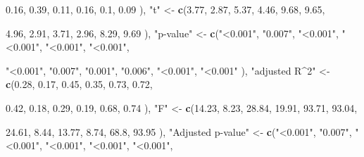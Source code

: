 \documentclass[
]{article}
\newenvironment{Shaded}{\begin{snugshade}}{\end{snugshade}}
\newcommand{\FloatTok}[1]{\textcolor[rgb]{0.00,0.00,0.81}{#1}}
\newcommand{\KeywordTok}[1]{\textcolor[rgb]{0.13,0.29,0.53}{\textbf{#1}}}
\newcommand{\NormalTok}[1]{#1}
\newcommand{\StringTok}[1]{\textcolor[rgb]{0.31,0.60,0.02}{#1}}
\begin{document}
\begin{Shaded}
\begin{Highlighting}[]
                                      \FloatTok{0.16}\NormalTok{, }\FloatTok{0.39}\NormalTok{, }\FloatTok{0.11}\NormalTok{, }\FloatTok{0.16}\NormalTok{, }\FloatTok{0.1}\NormalTok{, }\FloatTok{0.09}
\NormalTok{                                      ), }
                \StringTok{"t"}\NormalTok{ <-}\StringTok{ }\KeywordTok{c}\NormalTok{(}\FloatTok{3.77}\NormalTok{, }\FloatTok{2.87}\NormalTok{, }\FloatTok{5.37}\NormalTok{, }\FloatTok{4.46}\NormalTok{, }\FloatTok{9.68}\NormalTok{, }\FloatTok{9.65}\NormalTok{,}
                        
                          \FloatTok{4.96}\NormalTok{, }\FloatTok{2.91}\NormalTok{, }\FloatTok{3.71}\NormalTok{, }\FloatTok{2.96}\NormalTok{, }\FloatTok{8.29}\NormalTok{, }\FloatTok{9.69}
\NormalTok{                         ),}
                \StringTok{"p-value"}\NormalTok{ <-}\StringTok{ }\KeywordTok{c}\NormalTok{(}\StringTok{"<0.001"}\NormalTok{, }\StringTok{"0.007"}\NormalTok{, }\StringTok{"<0.001"}\NormalTok{, }\StringTok{"<0.001"}\NormalTok{, }\StringTok{"<0.001"}\NormalTok{, }\StringTok{"<0.001"}\NormalTok{,}
                               
                               \StringTok{"<0.001"}\NormalTok{, }\StringTok{"0.007"}\NormalTok{, }\StringTok{"0.001"}\NormalTok{, }\StringTok{"0.006"}\NormalTok{, }\StringTok{"<0.001"}\NormalTok{, }\StringTok{"<0.001"}
\NormalTok{                               ),}
                \StringTok{"adjusted R^2"}\NormalTok{ <-}\StringTok{ }\KeywordTok{c}\NormalTok{(}\FloatTok{0.28}\NormalTok{, }\FloatTok{0.17}\NormalTok{, }\FloatTok{0.45}\NormalTok{, }\FloatTok{0.35}\NormalTok{, }\FloatTok{0.73}\NormalTok{, }\FloatTok{0.72}\NormalTok{,}
                                    
                                    \FloatTok{0.42}\NormalTok{, }\FloatTok{0.18}\NormalTok{, }\FloatTok{0.29}\NormalTok{, }\FloatTok{0.19}\NormalTok{, }\FloatTok{0.68}\NormalTok{, }\FloatTok{0.74}
\NormalTok{                                    ),}
                \StringTok{"F"}\NormalTok{ <-}\StringTok{ }\KeywordTok{c}\NormalTok{(}\FloatTok{14.23}\NormalTok{, }\FloatTok{8.23}\NormalTok{, }\FloatTok{28.84}\NormalTok{, }\FloatTok{19.91}\NormalTok{, }\FloatTok{93.71}\NormalTok{, }\FloatTok{93.04}\NormalTok{,}
                         
                         \FloatTok{24.61}\NormalTok{, }\FloatTok{8.44}\NormalTok{, }\FloatTok{13.77}\NormalTok{, }\FloatTok{8.74}\NormalTok{, }\FloatTok{68.8}\NormalTok{, }\FloatTok{93.95}
\NormalTok{                         ),}
                \StringTok{"Adjusted p-value"}\NormalTok{ <-}\StringTok{ }\KeywordTok{c}\NormalTok{(}\StringTok{"<0.001"}\NormalTok{, }\StringTok{"0.007"}\NormalTok{, }\StringTok{"<0.001"}\NormalTok{, }\StringTok{"<0.001"}\NormalTok{, }\StringTok{"<0.001"}\NormalTok{, }\StringTok{"<0.001"}\NormalTok{,}
                                        

\end{Highlighting}
\end{Shaded}
\end{document}
